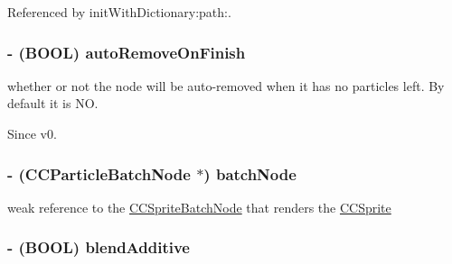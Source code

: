 Referenced by init\-With\-Dictionary\-:path\-:.

\hypertarget{interface_c_c_particle_system_a279831316b8454baf2922397eb6315c6}{
\subsubsection[{auto\-Remove\-On\-Finish}]{\setlength{\rightskip}{0pt plus 5cm}-\/ (B\-O\-O\-L) {\bf auto\-Remove\-On\-Finish}}}\label{interface_c_c_particle_system_a279831316b8454baf2922397eb6315c6}
whether or not the node will be auto-\/removed when it has no particles left. By default it is N\-O. \begin{DoxySince}{Since}
v0. 
\end{DoxySince}
\hypertarget{interface_c_c_particle_system_a01368df2d1792835d3c174dd3aba36be}{
\subsubsection[{batch\-Node}]{\setlength{\rightskip}{0pt plus 5cm}-\/ ({\bf C\-C\-Particle\-Batch\-Node} $\ast$) {\bf batch\-Node}}}\label{interface_c_c_particle_system_a01368df2d1792835d3c174dd3aba36be}
weak reference to the \hyperlink{interface_c_c_sprite_batch_node}{C\-C\-Sprite\-Batch\-Node} that renders the \hyperlink{class_c_c_sprite}{C\-C\-Sprite} \hypertarget{interface_c_c_particle_system_a70ae08e234d8bd069f2d1d37723fde25}{
\subsubsection[{blend\-Additive}]{\setlength{\rightskip}{0pt plus 5cm}-\/ (B\-O\-O\-L) {\bf blend\-Additive}}}\label{interface_c_c_particle_system_a70ae08e234d8bd069f2d1d37723fde25}
